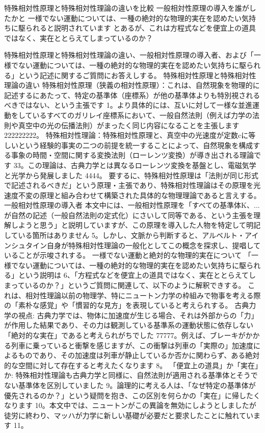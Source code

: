 \documentclass{article}
\begin{document}
特殊相対性原理と特殊相対性理論の違いを比較 
一般相対性原理の導入を誰がしたかと 
一様でない運動については、一種の絶対的な物理的実在を認めたい気持ちに駆られると説明されています とあるが、これは方程式などを便宜上の道具ではなく、実在ととらえてしまっているのか？


特殊相対性原理と特殊相対性理論の違い、一般相対性原理の導入者、および「一様でない運動については、一種の絶対的な物理的実在を認めたい気持ちに駆られる」という記述に関するご質問にお答えしする。
特殊相対性原理と特殊相対性理論の違い
特殊相対性原理（狭義の相対性原理）：これは、自然現象を物理的に記述するにあたって、特定の基準体（座標系）が他の基準体よりも特別視されるべきではない、という主張です 1。より具体的には、互いに対して一様な並進運動をしているすべてのガリレイ座標系において、一般自然法則（例えば力学の法則や真空中の光の伝播法則）がまったく同じ内容になることを主張します 222222222。
特殊相対性理論：特殊相対性原理と、真空中の光速度が定数cに等しいという経験的事実の二つの前提を統一することによって、自然現象を構成する事象の時間・空間に関する変換法則（ローレンツ変換）が導き出される理論です 33。この理論は、古典力学とは異なるローレンツ変換を基盤とし、電磁気学と光学から発展しました 4444。
要するに、特殊相対性原理は「法則が同じ形式で記述されるべきだ」という原理・主張であり、特殊相対性理論はその原理を光速度不変の原理と組み合わせて構築された具体的な物理理論であると言えする。
一般相対性原理の導入者
本文中には、一般相対性原理を「すべての基準体K、...が自然の記述（一般自然法則の定式化）にさいして同等である、という主張を理解しようと思う」と説明していますが、この原理を導入した人物を特定して明記している箇所はありません 5。しかし、文脈から判断すると、アルベルト・アインシュタイン自身が特殊相対性理論の一般化としてこの概念を探求し、提唱していることが示唆されする。
一様でない運動と絶対的な物理的実在について
「一様でない運動については、一種の絶対的な物理的実在を認めたい気持ちに駆られる」という説明は 6、「方程式などを便宜上の道具ではなく、実在ととらえてしまっているのか？」というご質問に関連して、以下のように解釈できする。
これは、相対性理論以前の物理学、特にニュートン力学の枠組みで物事を考える際の「素朴な感覚」や「慣習的な見方」を表現していると考えられする。
古典力学の視点: 古典力学では、物体に加速度が生じる場合、それは外部からの「力」が作用した結果であり、その力は観測している基準系の運動状態に依存しない「絶対的な実在」であると考えられがちでした 77777。例えば、ブレーキがかかる列車に乗っていると衝撃を感じますが、この衝撃は列車の「実際の」加速度によるものであり、その加速度は列車が静止しているか否かに関わらず、ある絶対的な空間に対して存在すると考えたくなります 8。
「便宜上の道具」か「実在」か: 特殊相対性理論も古典力学と同様に、自然法則が適用される基準体とそうでない基準体を区別していました 9。論理的に考える人は、「なぜ特定の基準体が優先されるのか？」という疑問を抱き、この区別を何らかの「実在」に帰したくなります 10。本文中では、ニュートンがこの異論を無効にしようとしましたが徒労に終わり、マッハが力学に新しい基礎が必要だと要求したことに触れています 11。
\end{document}
